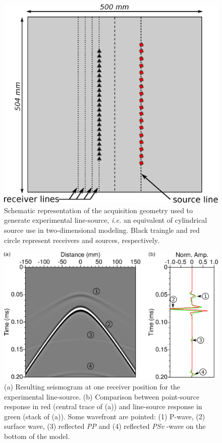 \documentclass[manuscript,revised]{geophysics}
\begin{document}
\begin{figure}[!h]
	\centering
	\includegraphics[scale=0.5]{fig/amplitude_acqui_principle.eps}
	\caption{Schematic representation of the acquisition geometry used to generate experimental line-source, \textit{i.e.} an equivalent of cylindrical source use in two-dimensional modeling. Black traingle and red circle represent receivers and sources, respectively.}
	\label{amplitude_acqui_principle}
\end{figure}

\begin{figure}[!h]
	\centering
	\includegraphics[scale=0.5]{fig/amplitude_stack_principle.eps}
	\caption{(a) Resulting seismogram at one receiver position for the experimental line-source. (b) Comparison between point-source response in red (central trace of (a)) and line-source response in green (stack of (a)). Some wavefront are pointed: (1) P-wave, (2) surface wave, (3) reflected \textit{PP} and (4) reflected \textit{PSv} -wave on the bottom of the model.}
	\label{amplitude_stack_principle}
\end{figure}
\end{document}
